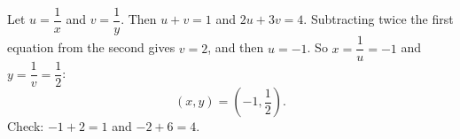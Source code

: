 Let $u=\dfrac{1}{x}$ and $v=\dfrac{1}{y}$. Then $u+v=1$ and $2u+3v=4$. Subtracting twice the first equation from the second gives $v=2$, and then $u=-1$. So $x=\dfrac{1}{u}=-1$ and $y=\dfrac{1}{v}=\dfrac{1}{2}$:
\[
\boxed{(x,y)=\left(-1,\dfrac{1}{2}\right)}.
\]
Check: $-1+2=1$ and $-2+6=4$.
